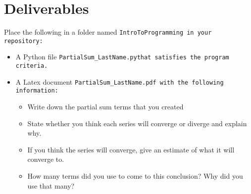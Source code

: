 \documentclass{article}
\newcommand\foldername{\tt{IntroToProgramming} }
\newcommand\filename{\tt{PartialSum\_LastName.py}\;\;}
\begin{document}
\section*{Deliverables}
	Place the following in a folder named \foldername in your repository:
	\begin{itemize}
		\item A Python file \filename  that satisfies the program criteria.
		\item A Latex document \tt{PartialSum\_LastName.pdf} with the following information:
		\begin{itemize}
			\item Write down the partial sum terms that you created
			\item State whether you think each series will converge or diverge and explain why.
			\item If you think the series will converge, give an estimate of what it will converge to.
			\item How many terms did you use to come to this conclusion?  Why did you use that many?
		\end{itemize}
	\end{itemize}

	
\end{document}
